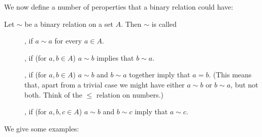 We now define a number of peroperties that a binary relation could have:
\begin{defn}
Let $\sim$ be a binary relation on a set $A$. Then $\sim$ is called
\begin{description}
\item[], if $a\sim a$ for every $a\in A$.
\item[], if (for $a,b\in A$) $a\sim b$ implies that $b\sim a$.
\item[], if (for $a,b\in A$) $a\sim b$ and $b\sim a$ together
imply that $a=b$. (This means that, apart from a trivial case we might have either
$a\sim b$ or $b\sim a$, but not both. Think of the $\le$ relation on numbers.)
\item[], if (for $a,b,c\in A$) $a\sim b$ and $b\sim c$ imply that
$a\sim c$.
\end{description}
\end{defn}
We give some examples: 
